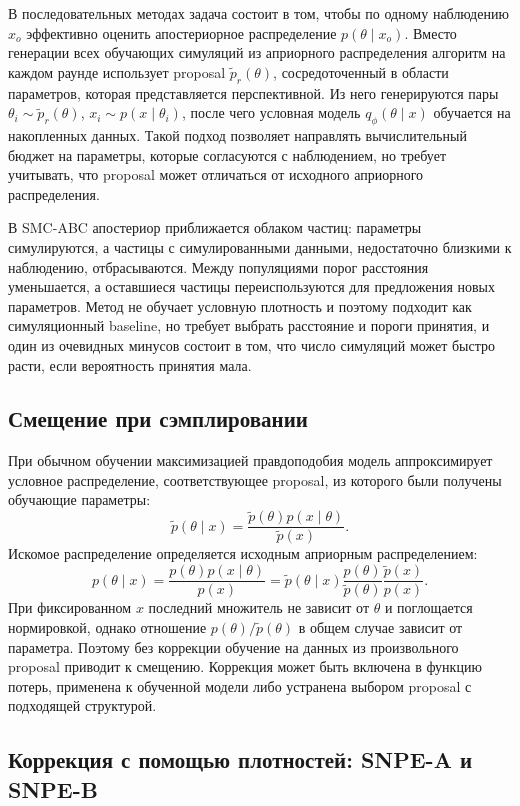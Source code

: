 В последовательных методах задача состоит в том, чтобы по одному
наблюдению $x_o$ эффективно оценить апостериорное распределение
$p(\theta\mid x_o)$. Вместо генерации всех обучающих симуляций из априорного
распределения алгоритм на каждом раунде использует proposal
$\tilde p_r(\theta)$, сосредоточенный в области параметров, которая
представляется перспективной. Из него генерируются пары
$\theta_i\sim\tilde p_r(\theta)$, $x_i\sim p(x\mid\theta_i)$, после чего
условная модель $q_\phi(\theta\mid x)$ обучается на накопленных данных.
Такой подход позволяет направлять вычислительный бюджет на параметры,
которые согласуются с наблюдением, но требует учитывать, что proposal
может отличаться от исходного априорного распределения.

В SMC-ABC апостериор приближается облаком частиц: параметры симулируются,
а частицы с симулированными данными, недостаточно близкими к наблюдению,
отбрасываются. Между популяциями порог расстояния уменьшается, а
оставшиеся частицы переиспользуются для предложения новых параметров.
Метод не обучает условную плотность и поэтому подходит как
симуляционный baseline, но требует выбрать расстояние и пороги принятия,
и один из очевидных минусов состоит в том, что число симуляций может
быстро расти, если вероятность принятия мала.

\subsection{Смещение при сэмплировании}

При обычном обучении максимизацией правдоподобия модель аппроксимирует
условное распределение, соответствующее proposal, из которого были
получены обучающие параметры:
\[
\tilde p(\theta\mid x)
=\frac{\tilde p(\theta)p(x\mid\theta)}{\tilde p(x)}.
\]
Искомое распределение определяется исходным априорным распределением:
\[
p(\theta\mid x)
=\frac{p(\theta)p(x\mid\theta)}{p(x)}
=\tilde p(\theta\mid x)
\frac{p(\theta)}{\tilde p(\theta)}
\frac{\tilde p(x)}{p(x)}.
\]
При фиксированном $x$ последний множитель не зависит от $\theta$ и
поглощается нормировкой, однако отношение $p(\theta)/\tilde p(\theta)$
в общем случае зависит от параметра. Поэтому без коррекции обучение на
данных из произвольного proposal приводит к смещению. Коррекция может
быть включена в функцию потерь, применена к обученной модели либо
устранена выбором proposal с подходящей структурой.

\subsection{Коррекция с помощью плотностей: SNPE-A и SNPE-B}


